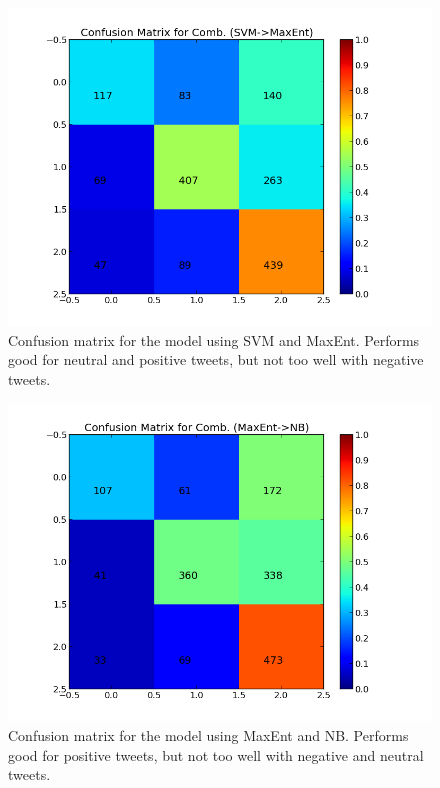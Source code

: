  \begin{minipage}[!htb]{\linewidth}
      \centering
     \begin{minipage}{0.45\linewidth}
          \begin{figure}[H]
               \includegraphics[width=\linewidth]{../img/plots/grid/confusion_matrix_Comb-SVM-MaxEnt.png}
           \caption[Plot showing the confusion matrix for two-step SVM -> MaxEnt]{Confusion matrix for the model using SVM and MaxEnt. Performs good for neutral and positive tweets, but not too well with negative tweets.}
           \label{fig:confmat_svm_maxent}
          \end{figure}
     \end{minipage}
     \hspace{0.05\linewidth}
     \begin{minipage}{0.45\linewidth}
          \begin{figure}[H]
               \includegraphics[width=\linewidth]{../img/plots/grid/confusion_matrix_Comb-MaxEnt-NB.png}
           \caption[Plot showing the confusion matrix for two-step MaxEnt -> NB]{Confusion matrix for the model using MaxEnt and NB. Performs good for positive tweets, but not too well with negative and neutral tweets.}
           \label{fig:confmat_maxent_nb}
          \end{figure}
     \end{minipage}
\end{minipage}
